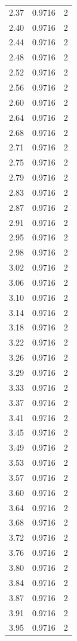 \begin{longtable}{lrr}
  2.37 & 0.9716 & 2 \\
  2.40 & 0.9716 & 2 \\
  2.44 & 0.9716 & 2 \\
  2.48 & 0.9716 & 2 \\
  2.52 & 0.9716 & 2 \\
  2.56 & 0.9716 & 2 \\
  2.60 & 0.9716 & 2 \\
  2.64 & 0.9716 & 2 \\
  2.68 & 0.9716 & 2 \\
  2.71 & 0.9716 & 2 \\
  2.75 & 0.9716 & 2 \\
  2.79 & 0.9716 & 2 \\
  2.83 & 0.9716 & 2 \\
  2.87 & 0.9716 & 2 \\
  2.91 & 0.9716 & 2 \\
  2.95 & 0.9716 & 2 \\
  2.98 & 0.9716 & 2 \\
  3.02 & 0.9716 & 2 \\
  3.06 & 0.9716 & 2 \\
  3.10 & 0.9716 & 2 \\
  3.14 & 0.9716 & 2 \\
  3.18 & 0.9716 & 2 \\
  3.22 & 0.9716 & 2 \\
  3.26 & 0.9716 & 2 \\
  3.29 & 0.9716 & 2 \\
  3.33 & 0.9716 & 2 \\
  3.37 & 0.9716 & 2 \\
  3.41 & 0.9716 & 2 \\
  3.45 & 0.9716 & 2 \\
  3.49 & 0.9716 & 2 \\
  3.53 & 0.9716 & 2 \\
  3.57 & 0.9716 & 2 \\
  3.60 & 0.9716 & 2 \\
  3.64 & 0.9716 & 2 \\
  3.68 & 0.9716 & 2 \\
  3.72 & 0.9716 & 2 \\
  3.76 & 0.9716 & 2 \\
  3.80 & 0.9716 & 2 \\
  3.84 & 0.9716 & 2 \\
  3.87 & 0.9716 & 2 \\
  3.91 & 0.9716 & 2 \\
  3.95 & 0.9716 & 2 \\

\end{longtable}

